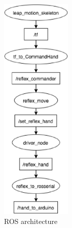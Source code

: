 \begin{figure}
  \centering
    \includegraphics[width=0.3\textwidth]{img/ROS_structure.eps}
  \caption{ROS architecture}
  \label{fig:rosstructure}
\end{figure}
